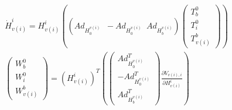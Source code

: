 \documentclass[a4paper,twoside, openright,12pt]{report}
\begin{document}
\begin{eqnarray}
	\dot{H}_{v(i)}^i = H_{v(i)}^i \left( (Ad_{H_0^{v(i)}} \;\; -Ad_{H_0^{v(i)}} \;\; Ad_{H_b^{v(i)}}) \begin{pmatrix} T_b^0 \\ T_i^0 \\ T_{v(i)}^b \end{pmatrix}\right)   \\
	\begin{pmatrix}W_b^{0} \\ W_i^{0} \\ W_{v(i)}^b\end{pmatrix}  = (H_{v(i)}^i)^T \left(
	\begin{pmatrix}Ad_{H_0^{v(i)}}^T \\ -Ad_{H_0^{v(i)}}^T \\ Ad_{H_b^{v(i)}}^T\end{pmatrix}
	\frac{\partial V_{v(i),i}}{\partial H_{v(i)}^i} \right) 
\end{eqnarray}
\end{document}
